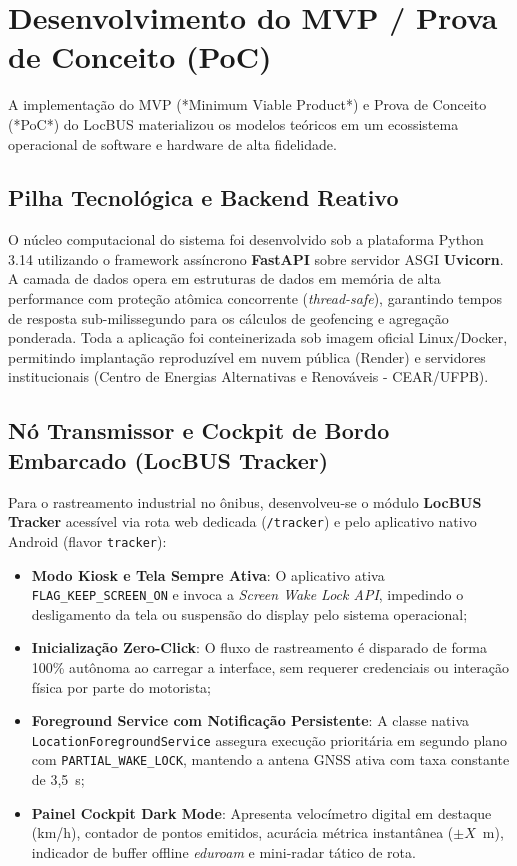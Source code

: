 \documentclass[lettersize,journal]{IEEEtran}
\begin{document}
\section{Desenvolvimento do MVP / Prova de Conceito (PoC)}
A implementação do MVP (*Minimum Viable Product*) e Prova de Conceito (*PoC*) do LocBUS materializou os modelos teóricos em um ecossistema operacional de software e hardware de alta fidelidade.

\subsection{Pilha Tecnológica e Backend Reativo}
O núcleo computacional do sistema foi desenvolvido sob a plataforma Python 3.14 utilizando o framework assíncrono \textbf{FastAPI} sobre servidor ASGI \textbf{Uvicorn}. A camada de dados opera em estruturas de dados em memória de alta performance com proteção atômica concorrente (\textit{thread-safe}), garantindo tempos de resposta sub-milissegundo para os cálculos de geofencing e agregação ponderada. Toda a aplicação foi conteinerizada sob imagem oficial Linux/Docker, permitindo implantação reproduzível em nuvem pública (Render) e servidores institucionais (Centro de Energias Alternativas e Renováveis - CEAR/UFPB).

\subsection{Nó Transmissor e Cockpit de Bordo Embarcado (LocBUS Tracker)}
Para o rastreamento industrial no ônibus, desenvolveu-se o módulo \textbf{LocBUS Tracker} acessível via rota web dedicada (\texttt{/tracker}) e pelo aplicativo nativo Android (flavor \texttt{tracker}):
\begin{itemize}
    \item \textbf{Modo Kiosk e Tela Sempre Ativa}: O aplicativo ativa \texttt{FLAG\_KEEP\_SCREEN\_ON} e invoca a \textit{Screen Wake Lock API}, impedindo o desligamento da tela ou suspensão do display pelo sistema operacional;
    \item \textbf{Inicialização Zero-Click}: O fluxo de rastreamento é disparado de forma 100\% autônoma ao carregar a interface, sem requerer credenciais ou interação física por parte do motorista;
    \item \textbf{Foreground Service com Notificação Persistente}: A classe nativa \texttt{LocationForegroundService} assegura execução prioritária em segundo plano com \texttt{PARTIAL\_WAKE\_LOCK}, mantendo a antena GNSS ativa com taxa constante de 3,5~s;
    \item \textbf{Painel Cockpit Dark Mode}: Apresenta velocímetro digital em destaque (km/h), contador de pontos emitidos, acurácia métrica instantânea ($\pm X$~m), indicador de buffer offline \textit{eduroam} e mini-radar tático de rota.
\end{itemize}
\end{document}
